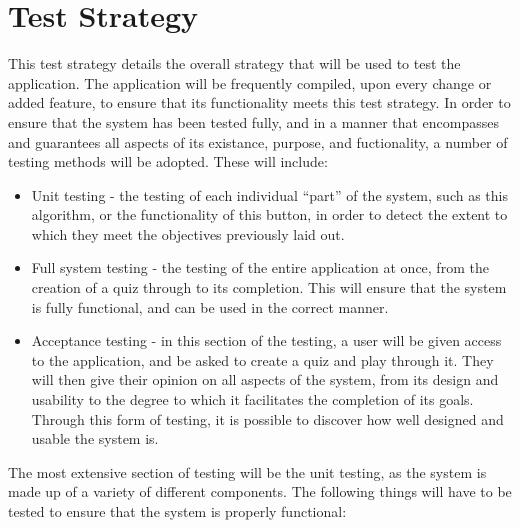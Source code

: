 \section{Test Strategy}
This test strategy details the overall strategy that will be used to test the application. The application will be frequently compiled, upon every change or added feature, to ensure that its functionality meets this test strategy. In order to ensure that the system has been tested fully, and in a manner that encompasses and guarantees all aspects of its existance, purpose, and fuctionality, a number of testing methods will be adopted. These will include:

\begin{itemize}
  \item Unit testing - the testing of each individual ``part'' of the system, such as this algorithm, or the functionality of this button, in order to detect the extent to which they meet the objectives previously laid out.

  \item Full system testing - the testing of the entire application at once, from the creation of a quiz through to its completion. This will ensure that the system is fully functional, and can be used in the correct manner.

  \item Acceptance testing - in this section of the testing, a user will be given access to the application, and be asked to create a quiz and play through it. They will then give their opinion on all aspects of the system, from its design and usability to the degree to which it facilitates the completion of its goals. Through this form of testing, it is possible to discover how well designed and usable the system is.
\end{itemize}

The most extensive section of testing will be the unit testing, as the system is made up of a variety of different components. The following things will have to be tested to ensure that the system is properly functional:

